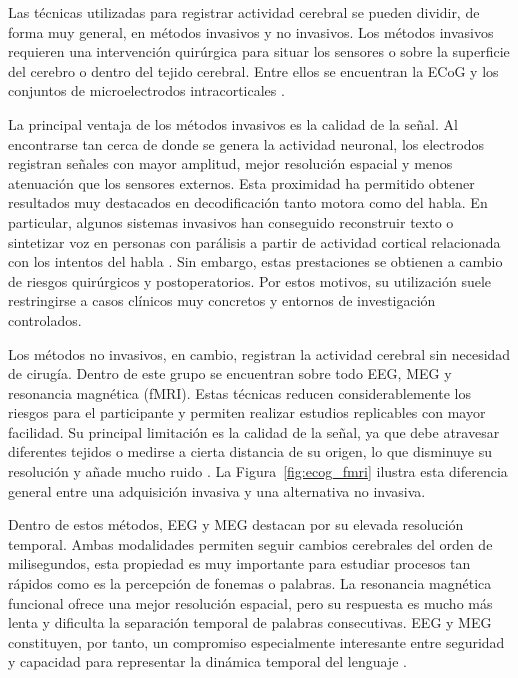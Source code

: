 Las técnicas utilizadas para registrar actividad cerebral se pueden dividir, de forma muy general, en métodos invasivos y no invasivos. Los métodos invasivos requieren una intervención quirúrgica para situar los sensores o sobre la superficie del cerebro o dentro del tejido cerebral. Entre ellos se encuentran la ECoG y los conjuntos de microelectrodos intracorticales \cite{silva2024speech}.

La principal ventaja de los métodos invasivos es la calidad de la señal. Al encontrarse tan cerca de donde se genera la actividad neuronal, los electrodos registran señales con mayor amplitud, mejor resolución espacial y menos atenuación que los sensores externos. Esta proximidad ha permitido obtener resultados muy destacados en decodificación tanto motora como del habla. En particular, algunos sistemas invasivos han conseguido reconstruir texto o sintetizar voz en personas con parálisis a partir de actividad cortical relacionada con los intentos del habla \cite{silva2024speech,willett2023highperformance,moses2021neuroprosthesis}. Sin embargo, estas prestaciones se obtienen a cambio de riesgos quirúrgicos y postoperatorios. Por estos motivos, su utilización suele restringirse a casos clínicos muy concretos y entornos de investigación controlados.

Los métodos no invasivos, en cambio, registran la actividad cerebral sin necesidad de cirugía. Dentro de este grupo se encuentran sobre todo EEG, MEG y resonancia magnética (fMRI). Estas técnicas reducen considerablemente los riesgos para el participante y permiten realizar estudios replicables con mayor facilidad. Su principal limitación es la calidad de la señal, ya que debe atravesar diferentes tejidos o medirse a cierta distancia de su origen, lo que disminuye su resolución y añade mucho ruido \cite{hamalainen1993meg,gross2013meg}. La Figura~\ref{fig:ecog_fmri} ilustra esta diferencia general entre una adquisición invasiva y una alternativa no invasiva.



Dentro de estos métodos, EEG y MEG destacan por su elevada resolución temporal. Ambas modalidades permiten seguir cambios cerebrales del orden de milisegundos, esta propiedad es muy importante para estudiar procesos tan rápidos como es la percepción de fonemas o palabras. La resonancia magnética funcional ofrece una mejor resolución espacial, pero su respuesta es mucho más lenta y dificulta la separación temporal de palabras consecutivas. EEG y MEG constituyen, por tanto, un compromiso especialmente interesante entre seguridad y capacidad para representar la dinámica temporal del lenguaje \cite{hamalainen1993meg,gross2013meg}.

